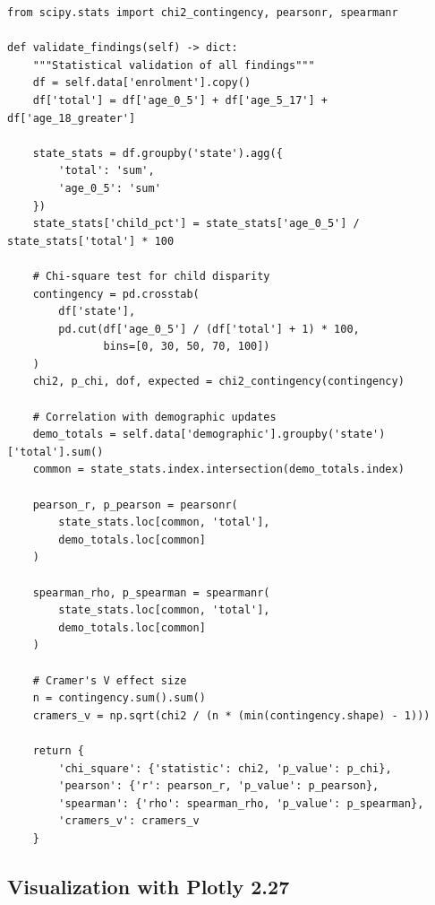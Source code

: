 \documentclass[12pt,a4paper]{article}
\begin{document}
\begin{lstlisting}[caption={Comprehensive Statistical Tests}]
from scipy.stats import chi2_contingency, pearsonr, spearmanr

def validate_findings(self) -> dict:
    """Statistical validation of all findings"""
    df = self.data['enrolment'].copy()
    df['total'] = df['age_0_5'] + df['age_5_17'] + df['age_18_greater']
    
    state_stats = df.groupby('state').agg({
        'total': 'sum',
        'age_0_5': 'sum'
    })
    state_stats['child_pct'] = state_stats['age_0_5'] / state_stats['total'] * 100
    
    # Chi-square test for child disparity
    contingency = pd.crosstab(
        df['state'],
        pd.cut(df['age_0_5'] / (df['total'] + 1) * 100, 
               bins=[0, 30, 50, 70, 100])
    )
    chi2, p_chi, dof, expected = chi2_contingency(contingency)
    
    # Correlation with demographic updates
    demo_totals = self.data['demographic'].groupby('state')['total'].sum()
    common = state_stats.index.intersection(demo_totals.index)
    
    pearson_r, p_pearson = pearsonr(
        state_stats.loc[common, 'total'],
        demo_totals.loc[common]
    )
    
    spearman_rho, p_spearman = spearmanr(
        state_stats.loc[common, 'total'],
        demo_totals.loc[common]
    )
    
    # Cramer's V effect size
    n = contingency.sum().sum()
    cramers_v = np.sqrt(chi2 / (n * (min(contingency.shape) - 1)))
    
    return {
        'chi_square': {'statistic': chi2, 'p_value': p_chi},
        'pearson': {'r': pearson_r, 'p_value': p_pearson},
        'spearman': {'rho': spearman_rho, 'p_value': p_spearman},
        'cramers_v': cramers_v
    }
\end{lstlisting}

\subsection{Visualization with Plotly 2.27}
\end{document}
